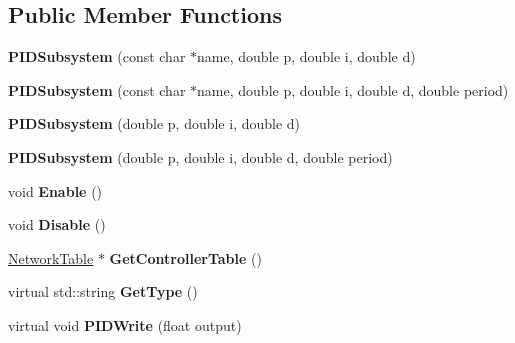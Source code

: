 \subsection*{Public Member Functions}
\begin{DoxyCompactItemize}
\item 
\hypertarget{classPIDSubsystem_a05439854c4c3e33d57b3f05680d0954e}{
{\bfseries PIDSubsystem} (const char $\ast$name, double p, double i, double d)}
\label{classPIDSubsystem_a05439854c4c3e33d57b3f05680d0954e}

\item 
\hypertarget{classPIDSubsystem_a4f29feae98e02cb4b48e0f2a7744bd3b}{
{\bfseries PIDSubsystem} (const char $\ast$name, double p, double i, double d, double period)}
\label{classPIDSubsystem_a4f29feae98e02cb4b48e0f2a7744bd3b}

\item 
\hypertarget{classPIDSubsystem_aebd38088d4de22db6ce256be08d5bd13}{
{\bfseries PIDSubsystem} (double p, double i, double d)}
\label{classPIDSubsystem_aebd38088d4de22db6ce256be08d5bd13}

\item 
\hypertarget{classPIDSubsystem_a14cb58e08eb54245e5f4c8a4efcb6586}{
{\bfseries PIDSubsystem} (double p, double i, double d, double period)}
\label{classPIDSubsystem_a14cb58e08eb54245e5f4c8a4efcb6586}

\item 
\hypertarget{classPIDSubsystem_a4a6d988326940c4cfb25c26ace2e5fc5}{
void {\bfseries Enable} ()}
\label{classPIDSubsystem_a4a6d988326940c4cfb25c26ace2e5fc5}

\item 
\hypertarget{classPIDSubsystem_ae1e15d6e0dbbb3fa7368beba4866e64e}{
void {\bfseries Disable} ()}
\label{classPIDSubsystem_ae1e15d6e0dbbb3fa7368beba4866e64e}

\item 
\hypertarget{classPIDSubsystem_af5ff70d270f677fbba25f03ccc7135c8}{
\hyperlink{classNetworkTable}{NetworkTable} $\ast$ {\bfseries GetControllerTable} ()}
\label{classPIDSubsystem_af5ff70d270f677fbba25f03ccc7135c8}

\item 
\hypertarget{classPIDSubsystem_a8e61ebdadeda0f6709fb4442402904fe}{
virtual std::string {\bfseries GetType} ()}
\label{classPIDSubsystem_a8e61ebdadeda0f6709fb4442402904fe}

\item 
\hypertarget{classPIDSubsystem_a2abe9351404409ad312675bbe02d2261}{
virtual void {\bfseries PIDWrite} (float output)}
\label{classPIDSubsystem_a2abe9351404409ad312675bbe02d2261}


\end{DoxyCompactItemize}

